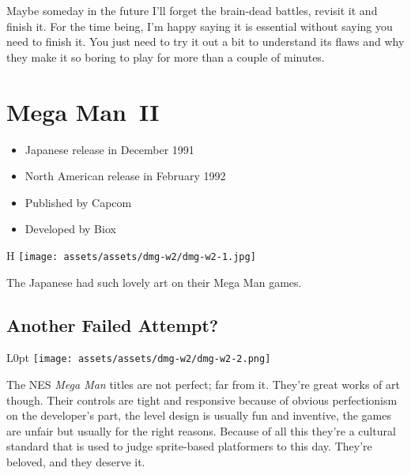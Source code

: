 \documentclass{book}
\begin{document}
Maybe someday in the future I’ll forget the brain-dead battles, revisit it and finish it. For the time being, I’m happy saying it is essential without saying you need to finish it. You just need to try it out a bit to understand its flaws and why they make it so boring to play for more than a couple of minutes.


\begingroup \chapter*{Mega Man II} \endgroup

\begin{itemize} \setlength\itemsep{-0.4em}
\item Japanese release in December 1991
\item North American release in February 1992
\item Published by Capcom
\item Developed by Biox
\end{itemize}\noindent

\begin{wrapfigure}{H}{\linewidth}
\vskip 4pt
\centering \texttt{[image: assets/assets/dmg-w2/dmg-w2-1.jpg]}\par\pagetwodescription The Japanese had such lovely art on their Mega Man games.\end{wrapfigure}
\clearpage

\FloatBarrier\needspace{10mm}\section*{Another Failed Attempt?}\nopagebreak[4]

\begin{wrapfigure}{L}{0pt} \texttt{[image: assets/assets/dmg-w2/dmg-w2-2.png]}\end{wrapfigure}
The NES \emph{Mega Man} titles are not perfect; far from it. They’re great works of art though. Their controls are tight and responsive because of obvious perfectionism on the developer’s part, the level design is usually fun and inventive, the games are unfair but usually for the right reasons. Because of all this they’re a cultural standard that is used to judge sprite-based platformers to this day. They’re beloved, and they deserve it.
\end{document}
